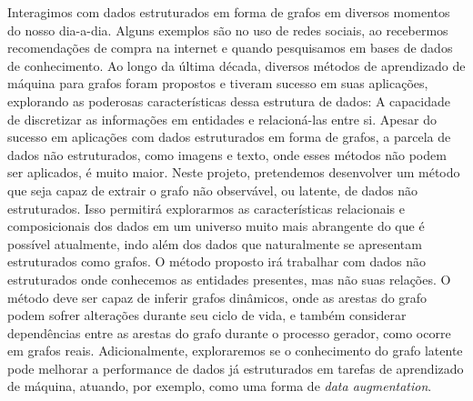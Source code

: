 Interagimos com dados estruturados em forma de grafos em diversos momentos do nosso dia-a-dia. Alguns exemplos são no uso de redes sociais, ao recebermos recomendações de compra na internet e quando pesquisamos em bases de dados de conhecimento.
%
Ao longo da última década, diversos métodos de aprendizado de máquina para grafos foram propostos e tiveram sucesso em suas aplicações, explorando as poderosas características dessa estrutura de dados: A capacidade de discretizar as informações em entidades e relacioná-las entre si.
%
Apesar do sucesso em aplicações com dados estruturados em forma de grafos, a parcela de dados não estruturados, como imagens e texto, onde esses métodos não podem ser aplicados, é muito maior.
%
Neste projeto, pretendemos desenvolver um método que seja capaz de extrair o grafo não observável, ou latente, de dados não estruturados.
%
Isso permitirá explorarmos as características relacionais e composicionais dos dados em um universo muito mais abrangente do que é possível atualmente, indo além dos dados que naturalmente se apresentam estruturados como grafos.
%
O método proposto irá trabalhar com dados não estruturados onde conhecemos as entidades presentes, mas não suas relações.
%
O método deve ser capaz de inferir grafos dinâmicos, onde as arestas do grafo podem sofrer alterações durante seu ciclo de vida, e também considerar dependências entre as arestas do grafo durante o processo gerador, como ocorre em grafos reais.
%
Adicionalmente, exploraremos se o conhecimento do grafo latente pode melhorar a performance de dados já estruturados em tarefas de aprendizado de máquina, atuando, por exemplo, como uma forma de \emph{data augmentation}.
